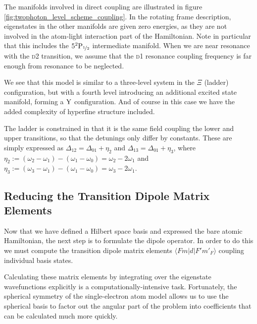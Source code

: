     The manifolds involved in direct coupling are illustrated in figure
    \ref{fig:twophoton_level_scheme_coupling}. In the rotating frame
    description, eigenstates in the other manifolds are given zero energies, as
    they are not involved in the atom-light interaction part of the Hamiltonian.
    Note in particular that this includes the $5^2\rm{P}_{\nicefrac{1}{2}}$
    intermediate manifold. When we are near resonance with the \textsc{d2}
    transition, we assume that the \textsc{d1} resonance coupling frequency is
    far enough from resonance to be neglected.

    We see that this model is similar to a three-level system in the $\Xi$
    (ladder) configuration, but with a fourth level introducing an additional
    excited state manifold, forming a $\rm{Y}$ configuration. And of course in
    this case we have the added complexity of hyperfine structure included.

    The ladder is constrained in that it is the same field coupling the lower
    and upper transitions, so that the detunings only differ by constants. These
    are simply expressed as $\Delta_{12} = \Delta_{01} + \eta_{2}$ and
    $\Delta_{13} = \Delta_{01} + \eta_{3}$, where $\eta_{2} := (\omega_2 -
    \omega_1) - (\omega_1 - \omega_0) = \omega_2 - 2\omega_1$ and $\eta_{3} :=
    (\omega_3 - \omega_1) - (\omega_1 - \omega_0) = \omega_3 - 2\omega_1$.

  \subsection{Reducing the Transition Dipole Matrix Elements}

    Now that we have defined a Hilbert space basis and expressed the bare atomic
    Hamiltonian, the next step is to formulate the dipole operator. In order to
    do this we must compute the transition dipole matrix elements
    $\langle F m | d | F' m'_F \rangle$ coupling individual
    basis states.

    Calculating these matrix elements by integrating over the eigenstate
    wavefunctions explicitly is a computationally-intensive task. Fortunately,
    the spherical symmetry of the single-electron atom model allows us to use
    the spherical basis to factor out the angular part of the problem into
    coefficients that can be calculated much more quickly.

